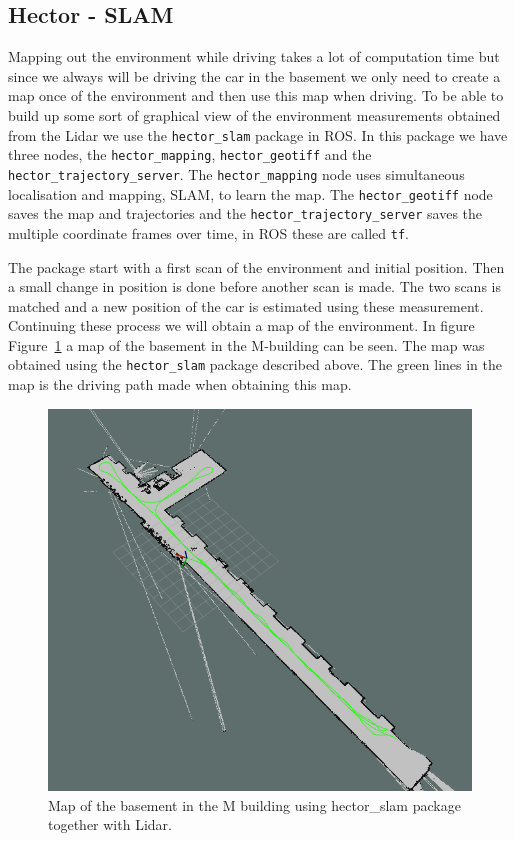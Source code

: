 \documentclass{LTHtwocol} %
\newcommand{\figref}[1]{Figure~\ref{#1}}
\begin{document}
\subsection{Hector - SLAM} \label{sec:Hector}
Mapping out the environment while driving takes a lot of computation time but since we always will be driving the car in the basement we only need to create a map once of the environment and then use this map when driving. To be able to build up some sort of graphical view of the environment measurements obtained from the Lidar we use the \texttt{hector\_slam} package in ROS. In this package we have three nodes, the \texttt{hector\_mapping}, \texttt{hector\_geotiff} and the \texttt{hector\_trajectory\_server}. The \texttt{hector\_mapping} node uses simultaneous localisation and mapping, SLAM, to learn the map. The \texttt{hector\_geotiff} node saves the map and trajectories and the \texttt{hector\_trajectory\_server} saves the multiple coordinate frames over time, in ROS these are called \texttt{tf}.

The package start with a first scan of the environment and initial position. Then a small change in position is done before another scan is made. The two scans is matched and a new position of the car is estimated using these measurement. Continuing these process we will obtain a map of the environment. 
In figure \figref{fig:hectorMap} a map of the basement in the M-building can be seen. The map was obtained using the \texttt{hector\_slam} package described above. The green lines in the map is the driving path made when obtaining this map. 

\begin{figure} [h]
	\centering
	\includegraphics[width=0.7\columnwidth]{images/hectorMap}
	\caption{Map of the basement in the M building using hector\_slam package together with Lidar.}
	\label{fig:hectorMap}
\end{figure}
\end{document}
